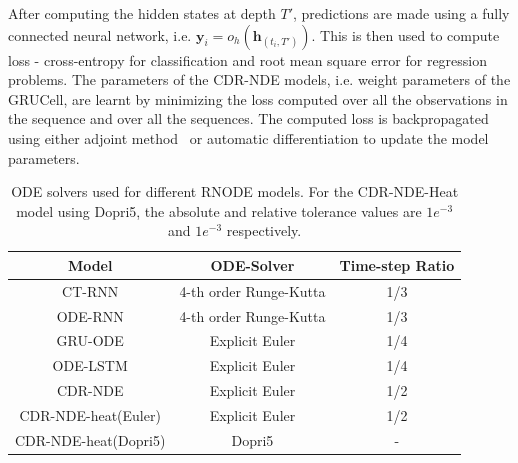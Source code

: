 \documentclass{article} %
\newcommand{\by}{\mathbf{y}}
\newcommand{\bh}{\mathbf{h}}
\begin{document}

After computing the hidden states at depth $T'$, predictions are made using a fully connected neural network, i.e. $\by_i = o_h(\bh_{(t_i,T')})$. This is then used to compute loss - cross-entropy for classification and root mean square error for regression problems. The parameters of the CDR-NDE models, i.e. weight parameters of the GRUCell, are learnt by minimizing the loss computed over all the observations in the sequence and over all the sequences. The computed loss is backpropagated using either adjoint method~\citep{node} or automatic differentiation to update the model parameters. 

 \begin{table}
    \centering
    \caption{ODE solvers used for different RNODE models. For the CDR-NDE-Heat model using Dopri5, the absolute and relative tolerance values are $1e^{-3}$ and $1e^{-3}$ respectively.}
    \begin{tabular}{|c|c|c|}
        \hline
            Model & ODE-Solver & Time-step Ratio \\ 
        \hline
            CT-RNN & 4-th order Runge-Kutta & 1/3 \\
            ODE-RNN & 4-th order Runge-Kutta & 1/3 \\
            GRU-ODE & Explicit Euler & 1/4 \\
            ODE-LSTM & Explicit Euler & 1/4 \\
            CDR-NDE & Explicit Euler & 1/2 \\
            CDR-NDE-heat(Euler) & Explicit Euler & 1/2 \\
            CDR-NDE-heat(Dopri5) & Dopri5 & - \\
         \hline
    \end{tabular}
    \label{tab:solvers}
\end{table}
\end{document}
